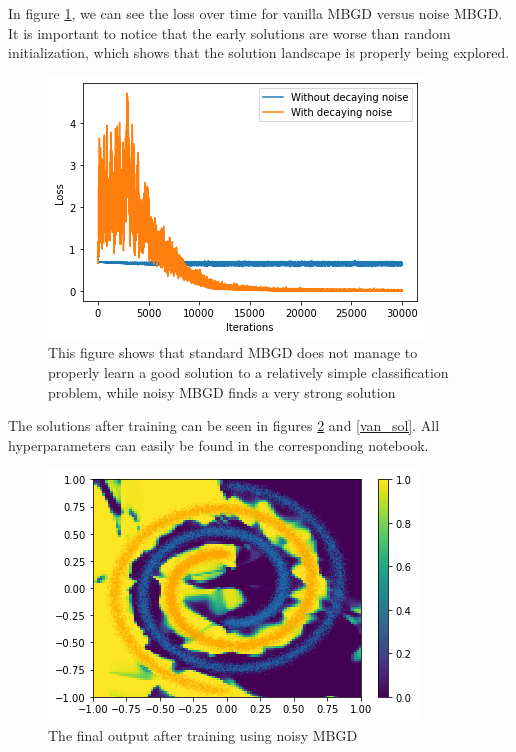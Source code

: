 \documentclass[twocolumn]{article}
\begin{document}
In figure \ref{loss}, we can see the loss over time for vanilla MBGD versus noise MBGD. It is important to notice that the early solutions are worse than random initialization, which shows that the solution landscape is properly being explored.

\begin{figure}[ht!]
\begin{center}
  \centerline{\includegraphics[width=\columnwidth]{src/loss.png}}
  \caption{This figure shows that standard MBGD does not manage to properly learn a good solution to a relatively simple classification problem, while noisy MBGD finds a very strong solution}
  \label{loss}
\end{center}
\vskip -0.2in
\end{figure}

The solutions after training can be seen in figures \ref{noisy_sol} and \ref{van_sol}. All hyperparameters can easily be found in the corresponding notebook.

\begin{figure}[ht!]
\begin{center}
  \centerline{\includegraphics[width=\columnwidth]{src/noise_sol.png}}
  \caption{The final output after training using noisy MBGD}
  \label{noisy_sol}
\end{center}
\vskip -0.2in
\end{figure}
\end{document}
